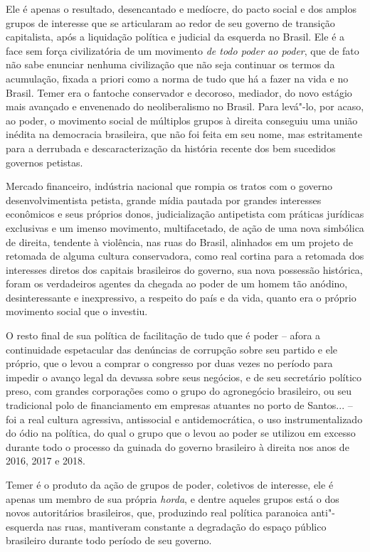 Ele é apenas o resultado, desencantado e medíocre, do pacto social e dos
amplos grupos de interesse que se articularam ao redor de seu governo de
transição capitalista, após a liquidação política e judicial da esquerda
no Brasil. Ele é a face sem força civilizatória de um movimento \emph{de
todo poder ao poder}, que de fato não sabe enunciar nenhuma civilização
que não seja continuar os termos da acumulação, fixada a priori como a
norma de tudo que há a fazer na vida e no Brasil. Temer era o fantoche
conservador e decoroso, mediador, do novo estágio mais avançado e
envenenado do neoliberalismo no Brasil. Para levá"-lo, por acaso, ao
poder, o movimento social de múltiplos grupos à direita conseguiu uma
união inédita na democracia brasileira, que não foi feita em seu nome,
mas estritamente para a derrubada e descaracterização da história
recente dos bem sucedidos governos petistas.

Mercado financeiro, indústria nacional que rompia os tratos com o
governo desenvolvimentista petista, grande mídia pautada por grandes
interesses econômicos e seus próprios donos, judicialização antipetista
com práticas jurídicas exclusivas e um imenso movimento, multifacetado,
de ação de uma nova simbólica de direita, tendente à violência, nas ruas
do Brasil, alinhados em um projeto de retomada de alguma cultura
conservadora, como real cortina para a retomada dos interesses diretos
dos capitais brasileiros do governo, sua nova possessão histórica, foram
os verdadeiros agentes da chegada ao poder de um homem tão anódino,
desinteressante e inexpressivo, a respeito do país e da vida, quanto era
o próprio movimento social que o investiu.

O resto final de sua política de facilitação de tudo que é poder --
afora a continuidade espetacular das denúncias de corrupção sobre seu
partido e ele próprio, que o levou a comprar o congresso por duas vezes
no período para impedir o avanço legal da devassa sobre seus negócios, e
de seu secretário político preso, com grandes corporações como o grupo
 do agronegócio brasileiro, ou seu tradicional polo de financiamento
em empresas atuantes no porto de Santos... -- foi a real cultura
agressiva, antissocial e antidemocrática, o uso instrumentalizado do
ódio na política, do qual o grupo que o levou ao poder se utilizou em
excesso durante todo o processo da guinada do governo brasileiro à
direita nos anos de 2016, 2017 e 2018.

Temer é o produto da ação de grupos de poder, coletivos de interesse,
ele é apenas um membro de sua própria \emph{horda}, e dentre aqueles
grupos está o dos novos autoritários brasileiros, que, produzindo real
política paranoica anti"-esquerda nas ruas, mantiveram constante a
degradação do espaço público brasileiro durante todo período de seu
governo.

